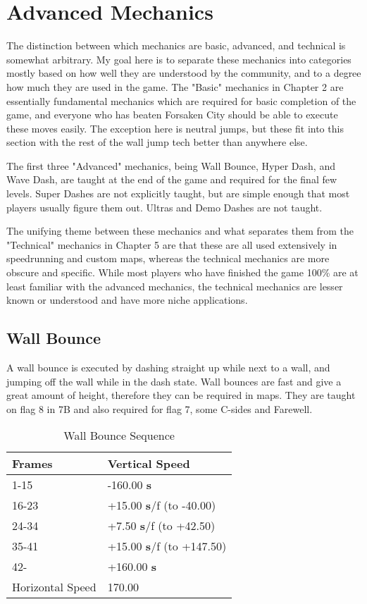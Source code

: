 \documentclass[oneside]{book}
\newcommand{\s}{\textbf{s}}
\begin{document}
\chapter{Advanced Mechanics}

The distinction between which mechanics are basic, advanced, and technical is somewhat arbitrary. My goal here is to separate these mechanics into categories mostly based on how well they are understood by the community, and to a degree how much they are used in the game. The "Basic" mechanics in Chapter 2 are essentially fundamental mechanics which are required for basic completion of the game, and everyone who has beaten Forsaken City should be able to execute these moves easily. The exception here is neutral jumps, but these fit into this section with the rest of the wall jump tech better than anywhere else.

The first three "Advanced" mechanics, being Wall Bounce, Hyper Dash, and Wave Dash, are taught at the end of the game and required for the final few levels. Super Dashes are not explicitly taught, but are simple enough that most players usually figure them out. Ultras and Demo Dashes are not taught.

The unifying theme between these mechanics and what separates them from the "Technical" mechanics in Chapter 5 are that these are all used extensively in speedrunning and custom maps, whereas the technical mechanics are more obscure and specific. While most players who have finished the game 100\% are at least familiar with the advanced mechanics, the technical mechanics are lesser known or understood and have more niche applications.

\section{Wall Bounce}

A wall bounce is executed by dashing straight up while next to a wall, and jumping off the wall while in the dash state. Wall bounces are fast and give a great amount of height, therefore they can be required in maps. They are taught on flag 8 in 7B and also required for flag 7, some C-sides and Farewell.

\begin{table}[h]
\begin{tabular}{|l|l|}
\hline
Frames&Vertical Speed\\
\hline
1-15&-160.00 \s\\
\hline
16-23&+15.00 \s/f (to -40.00)\\
\hline
24-34&+7.50 \s/f (to +42.50)\\
\hline
35-41&+15.00 \s/f (to +147.50)\\
\hline
42-&+160.00 \s\\
\hline
Horizontal Speed&170.00\\
\hline
\end{tabular} 
\caption{Wall Bounce Sequence}
\end{table}
\end{document}
